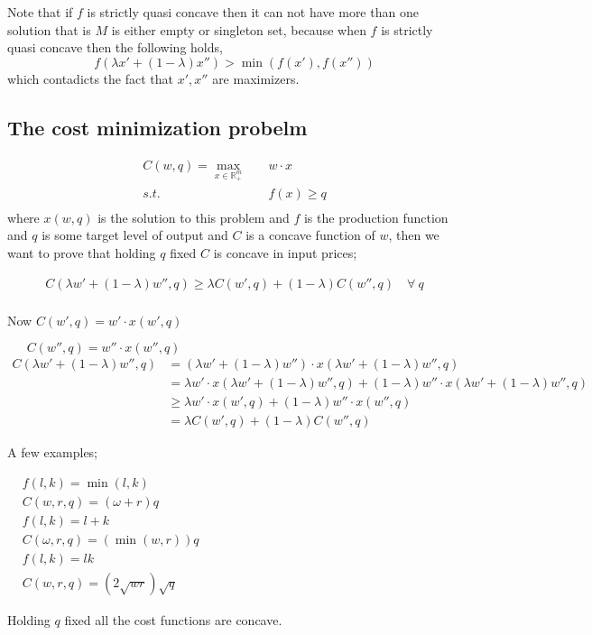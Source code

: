 \documentclass[12pt,a4paper]{article}
\begin{document}
Note that if \(f\) is strictly quasi concave then it can not have more than one solution that is \(M\) is either empty or singleton set, because when \(f\) is strictly quasi concave then the following holds,
\begin{equation*}
    f(\lambda x' + (1-\lambda)x'') > \min(f(x'),f(x'')) 
\end{equation*} 
which contadicts the fact that \(x',x''\) are maximizers.      

\subsection{ The cost minimization probelm}
 \begin{align*}
      C(w,q) = \max_{x \in \mathbb{R}^m_{+}} & \quad w\cdot x \\
       s.t. & \quad f(x) \geq q \\
\end{align*}
where \(x(w,q)\) is the solution to this problem and \(f\) is the production function and \(q\) is some target level of output and \(C\) is a concave function of \(w\), then we want to prove that holding \(q\) fixed \(C\) is concave in input prices;

 \begin{align*}
    C(\lambda w' + (1-\lambda)w'' ,q) \geq \lambda C(w',q) + (1-\lambda)C(w'',q) \quad \forall \ q\\
\end{align*}

Now \(C(w',q)=w' \cdot x(w',q)\) 

\( \ \ \ \ \ \ \ C(w'',q)=w'' \cdot x(w'',q)\) 
 \begin{align*}
    C(\lambda w' +(1-\lambda)w'', q)&= (\lambda w' +(1-\lambda)w'') \cdot x(\lambda w' +(1-\lambda)w'',q)\\
    &=\lambda w' \cdot x(\lambda w' +(1-\lambda)w'', q)+ (1-\lambda)w''\cdot x(\lambda w' +(1-\lambda)w'',q)\\
    &\geq \lambda w' \cdot x(w',q) + (1-\lambda) w'' \cdot x(w'',q)\\
    &=\lambda C(w',q) + (1-\lambda)C(w'',q)
\end{align*} 

A few examples;

\(\begin{aligned} & f(l, k)=\min (l, k) \\ & C(w, r, q)=(\omega+r) q \\ 
    & f(l, k)=l+k \\ & C(\omega, r, q)=(\min (w, r)) q \\ 
    & f(l, k)=l k \\ & C(w, r, q)=(2 \sqrt{w r}) \sqrt{q}
\end{aligned}\)

Holding \(q\) fixed all the cost functions are concave. 
\end{document}
